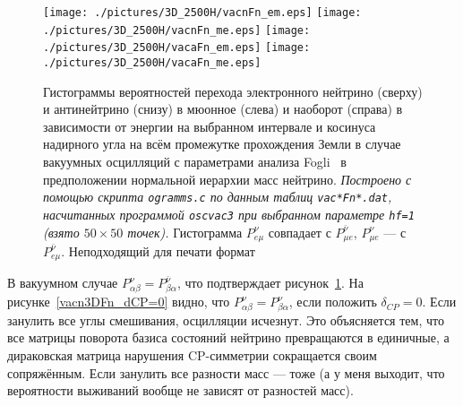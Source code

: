 \begin{figure}[!ht]
\texttt{[image: ./pictures/3D\_2500H/vacnFn\_em.eps]}
\texttt{[image: ./pictures/3D\_2500H/vacnFn\_me.eps]}
\texttt{[image: ./pictures/3D\_2500H/vacaFn\_em.eps]}
\texttt{[image: ./pictures/3D\_2500H/vacaFn\_me.eps]}
\caption{Гистограммы вероятностей перехода электронного нейтрино (сверху) и антинейтрино (снизу) в мюонное (слева) и наоборот (справа) в зависимости от энергии на выбранном интервале и косинуса надирного угла на всём промежутке прохождения Земли в случае вакуумных осцилляций с параметрами анализа Fogli~\cite{Fogli:2012ua} в предположении нормальной иерархии масс нейтрино. \textit{Построено с помощью скрипта \texttt{ogramms.c} по данным таблиц \texttt{vac*Fn*.dat}, насчитанных программой \texttt{oscvac3} при выбранном параметре \texttt{hf=1} (взято $50\times50$ точек).} Гистограмма $P^{\nu}_{e\mu}$ совпадает с $P^{\bar\nu}_{\mu{}e}$, $P^{\nu}_{\mu{}e}$ --- с $P^{\bar\nu}_{e\mu}$. {\color{magenta}Неподходящий для печати формат}}
\label{vac3DFn}
\end{figure}
\newpage
В вакуумном случае $P^{\nu}_{\alpha\beta}=P^{\bar\nu}_{\beta\alpha}$, что подтверждает рисунок~\ref{vac3DFn}. На рисунке~\ref{vacn3DFn_dCP=0} видно, что $P^{\nu}_{\alpha\beta}=P^{\nu}_{\beta\alpha}$, если положить $\delta_{CP}=0$. Если занулить все углы смешивания, осцилляции исчезнут. \textsf{Это объясняется тем, что все матрицы поворота базиса состояний нейтрино превращаются в единичные, а дираковская матрица нарушения CP-симметрии сокращается своим сопряжённым.} Если занулить {\color{red}все разности масс} --- тоже {\color{red}(а у меня выходит, что вероятности выживаний вообще не зависят от разностей масс)}.
\clearpage
